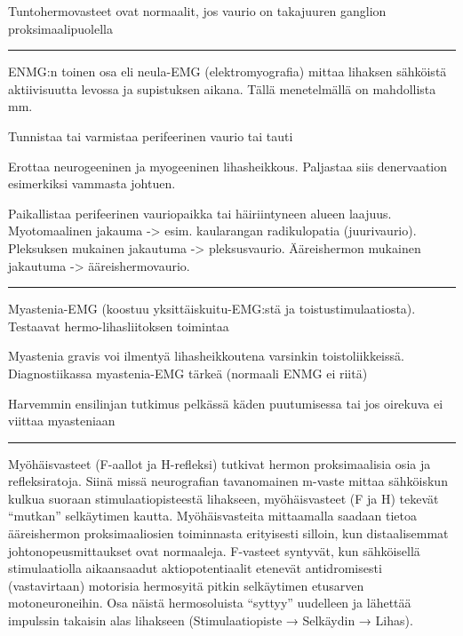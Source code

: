 \documentclass[
]{book}
\begin{document}
Tuntohermovasteet ovat normaalit, jos vaurio on takajuuren ganglion proksimaalipuolella

\begin{center}\rule{0.5\linewidth}{0.5pt}\end{center}

ENMG:n toinen osa eli neula-EMG (elektromyografia) mittaa lihaksen sähköistä aktiivisuutta levossa ja supistuksen aikana. Tällä menetelmällä on mahdollista mm.

Tunnistaa tai varmistaa perifeerinen vaurio tai tauti

Erottaa neurogeeninen ja myogeeninen lihasheikkous. Paljastaa siis denervaation esimerkiksi vammasta johtuen.

Paikallistaa perifeerinen vauriopaikka tai häiriintyneen alueen laajuus. Myotomaalinen jakauma -\textgreater{} esim. kaularangan radikulopatia (juurivaurio). Pleksuksen mukainen jakautuma -\textgreater{} pleksusvaurio. Ääreishermon mukainen jakautuma -\textgreater{} ääreishermovaurio.

\begin{center}\rule{0.5\linewidth}{0.5pt}\end{center}

Myastenia-EMG (koostuu yksittäiskuitu-EMG:stä ja toistustimulaatiosta). Testaavat hermo-lihasliitoksen toimintaa

Myastenia gravis voi ilmentyä lihasheikkoutena varsinkin toistoliikkeissä. Diagnostiikassa myastenia-EMG tärkeä (normaali ENMG ei riitä)

Harvemmin ensilinjan tutkimus pelkässä käden puutumisessa tai jos oirekuva ei viittaa myasteniaan

\begin{center}\rule{0.5\linewidth}{0.5pt}\end{center}

Myöhäisvasteet (F-aallot ja H-refleksi) tutkivat hermon proksimaalisia osia ja refleksiratoja. Siinä missä neurografian tavanomainen m-vaste mittaa sähköiskun kulkua suoraan stimulaatiopisteestä lihakseen, myöhäisvasteet (F ja H) tekevät ``mutkan'' selkäytimen kautta. Myöhäisvasteita mittaamalla saadaan tietoa ääreishermon proksimaaliosien toiminnasta erityisesti silloin, kun distaalisemmat johtonopeusmittaukset ovat normaaleja. F-vasteet syntyvät, kun sähköisellä stimulaatiolla aikaansaadut aktiopotentiaalit etenevät antidromisesti (vastavirtaan) motorisia hermosyitä pitkin selkäytimen etusarven motoneuroneihin. Osa näistä hermosoluista ``syttyy'' uudelleen ja lähettää impulssin takaisin alas lihakseen (Stimulaatiopiste → Selkäydin → Lihas).
\end{document}
